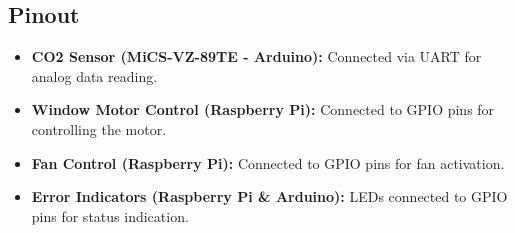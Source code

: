 \subsection{Pinout}
\begin{itemize}
    \item \textbf{CO2 Sensor (MiCS-VZ-89TE - Arduino):} Connected via UART for analog data reading.
    \item \textbf{Window Motor Control (Raspberry Pi):} Connected to GPIO pins for controlling the motor.
    \item \textbf{Fan Control (Raspberry Pi):} Connected to GPIO pins for fan activation.
    \item \textbf{Error Indicators (Raspberry Pi \& Arduino):} LEDs connected to GPIO pins for status indication.
\end{itemize}
